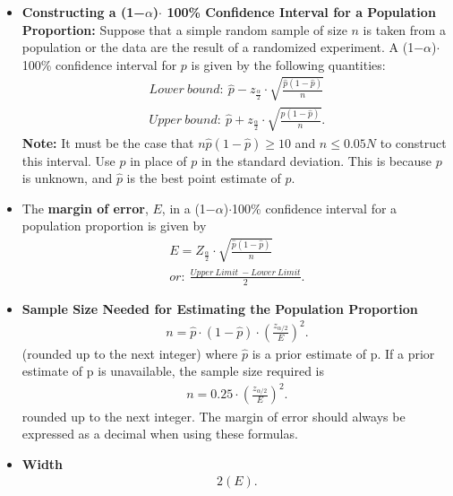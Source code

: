 \documentclass{report}
\begin{document}
        \pagebreak \bigbreak \noindent 
        \begin{itemize}
            \item  \textbf{Constructing a (1−$\alpha $)$\cdot$ 100\% Confidence Interval for a Population Proportion:}
            Suppose that a simple random sample of size $n $ is taken from a population or the data are the result of a randomized experiment. A (1−$\alpha $)$\cdot  $100\% confidence interval for $p $ is given by the following quantities:
          \begin{align*}
              Lower\ bound:\ \hat{p} - z_{\frac{\alpha}{2}} \cdot \sqrt{\frac{\hat{p}(1 - \hat{p})}{n}}  \\
              Upper\ bound:\ \hat{p} + z_{\frac{\alpha}{2}} \cdot \sqrt{\frac{\hat{p}(1 - \hat{p})}{n}}
          .\end{align*}
          \textbf{Note:} It must be the case that $n\hat{p}(1-\hat{p})\geq 10$ and $n \leq 0.05N$ to construct this interval. Use $\hat{p}$ in place of $p$ in the standard deviation. This is because $p$ is unknown, and $\hat{p}$ is the best point estimate of $p$.
          \item The \textbf{margin of error}, $E $, in a (1−$\alpha $)$\cdot  $100\% confidence interval for a population proportion is given by
          \begin{align*}
              E = Z_{\frac{\alpha}{2}} \cdot \sqrt{\frac{\hat{p}(1-\hat{p})}{n}} \\
              or:\ \frac{Upper\ Limit\ - Lower\ Limit}{2}
          .\end{align*}
      \item \textbf{Sample Size Needed for Estimating the Population Proportion}
          \begin{align*}
              n = \hat{p} \cdot (1 - \hat{p}) \cdot \left(\frac{z_{\alpha/2}}{E}\right)^2 
          .\end{align*}
          (rounded up to the next integer) where $\hat{p}$ is a prior estimate of p.
          \bigbreak \noindent 
          If a prior estimate of p is unavailable, the sample size required is
          \begin{align*}
              n = 0.25 \cdot \left(\frac{z_{\alpha/2}}{E}\right)^2
          .\end{align*}
          rounded up to the next integer. The margin of error should always be expressed as a decimal when using these formulas.
        \item \textbf{Width}
            \begin{align*}
                2(E)
            .\end{align*}

        \end{itemize}
        \bigbreak \noindent 
\end{document}
